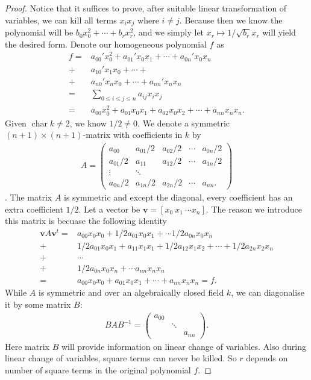 \begin{proof}
    Notice that it suffices to prove, after suitable linear transformation of variables, we can kill all terms $x_ix_j$ where $i\neq j$. Because then we know the polynomial will be $b_0x_0^2+\cdots+b_rx_r^2$, and we simply let $x_r\mapsto 1/\sqrt{b_r} x_r$ will yield the desired form. Denote our homogeneous polynomial $f$ as 
    \begin{align*}
        f=&a_{00}'x_0^2+a_{01}'x_0x_1+\cdots+a_{0n}'x_0x_n\\
        +&a_{10}'x_1x_0+\cdots+ \\
        +&a_{n0}'x_nx_0+\cdots+a_{nn}'x_nx_n\\
        =& \sum_{0\leq i\leq j\leq n} a_{ij}x_ix_j\\
        =&a_{00}x_0^2+a_{01}x_0x_1+a_{02}x_0x_2+\cdots+a_{nn}x_nx_n.
    \end{align*}
    Given $\operatorname{char} k\neq 2$, we know $1/2\neq 0$. We denote a symmetric $(n+1)\times (n+1)$-matrix with coefficients in $k$ by 
    \begin{align*}
        A=\begin{pmatrix}
            a_{00} & a_{01}/2 & a_{02}/2 & \cdots & a_{0n}/2\\
            a_{01}/2 & a_{11} & a_{12}/2 & \cdots & a_{1n}/2\\
            \vdots & \ddots  \\
            a_{0n}/2 & a_{1n}/2 & a_{2n}/2 & \cdots & a_{nn}.
        \end{pmatrix}
    \end{align*}.
    The matrix $A$ is symmetric and except the diagonal, every coefficient has an extra coefficient $1/2$. Let a vector be $\mathbf v=[x_0~ x_1~ \cdots x_n]$. The reason we introduce this matrix is becuase the following identity 
    \begin{align*}
        \mathbf v A \mathbf v^{t} = &a_{00}x_0x_0+1/2 a_{01}x_0x_1+\cdots 1/2 a_{0n}x_0x_n\\
        + &1/2a_{01}x_0x_1+a_{11}x_1x_1+1/2a_{12}x_1x_2+\cdots+1/2a_{2n}x_2x_n\\
        + &\cdots\\
        + &1/2a_{0n}x_0x_n+\cdots a_{nn}x_nx_n\\
        = &a_{00}x_0x_0+a_{01}x_0x_1+\cdots+a_{nn}x_nx_n=f.
    \end{align*}
    While $A$ is symmetric and over an algebraically closed field $k$, we can diagonalise it by some matrix $B$: 
    \begin{align*}
        BAB^{-1}=\begin{pmatrix}
            a_{00} & & \\
            & \ddots & \\
            & & a_{nn}
        \end{pmatrix}.
    \end{align*}
    Here matrix $B$ will provide information on linear change of variables. Also during linear change of variables, square terms can never be killed. So $r$ depends on number of square terms in the original polynomial $f$. 
\end{proof}

